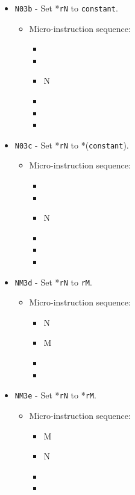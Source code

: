 \documentclass{article}
\begin{document}
\begin{itemize}
    \item \Verb|N03b| - Set *\Verb|rN| to \Verb|constant|.
    \begin{itemize}
        \item Micro-instruction sequence:
        \begin{itemize}
            \item \pkptroutinc
            \item \datatotmpa
            \item \regtoaddr N
            \item \tmpatodata
            \item \writeRAM
            \item \done
        \end{itemize}
    \end{itemize}
    
    \item \Verb|N03c| - Set *\Verb|rN| to *(\Verb|constant|).
    \begin{itemize}
        \item Micro-instruction sequence:
        \begin{itemize}
            \item \pkptroutinc
            \item \datatotmpa
            \item \regtoaddr N
            \item \tmpaptrout
            \item \writeRAM
            \item \done
        \end{itemize}
    \end{itemize}
    
    \item \Verb|NM3d| - Set *\Verb|rN| to \Verb|rM|.
    \begin{itemize}
        \item Micro-instruction sequence:
        \begin{itemize}
            \item \regtoaddr N
            \item \regtodata M
            \item \writeRAM
            \item \done
        \end{itemize}
    \end{itemize}

    \item \Verb|NM3e| - Set *\Verb|rN| to *\Verb|rM|.
    \begin{itemize}
        \item Micro-instruction sequence:
        \begin{itemize}
            \item \regtoaddr M
            \item \regtodata N
            \item \writeRAM
            \item \done
        \end{itemize}
    \end{itemize}


\end{itemize}
\end{document}
